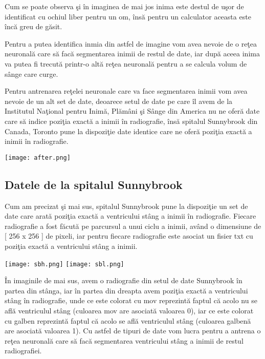 Cum se poate observa \c{s}i \^{i}n imaginea de mai jos inima este destul de u\c{s}or de identificat cu ochiul liber pentru un om, \^{i}ns\u{a} pentru un calculator aceasta este \^{i}nc\u{a} greu de g\u{a}sit.

\par

Pentru a putea identifica inmia din astfel de imagine vom avea nevoie de o re\c{t}ea neuronal\u{a} care s\u{a} fac\u{a} segmentarea inimii de restul de date, iar dup\u{a} aceea inima va putea fi trecut\u{a} printr-o alt\u{a} re\c{t}ea neuronal\u{a} pentru a se calcula volum de s\^{a}nge care curge.

\par

Pentru antrenarea re\c{t}elei neuronale care va face segmentarea inimii vom avea nevoie de un alt set de date, deoarece setul de date pe care \^{i}l avem de la Institutul Na\c{t}ional pentru Inim\u{a}, Pl\u{a}m\^{a}ni \c{s}i S\^{a}nge din America nu ne ofer\u{a} date care s\u{a} indice pozi\c{t}ia exact\u{a} a inimii \^{i}n radiografie, \^{i}ns\u{a} spitalul Sunnybrook din Canada, Toronto pune la dispozi\c{t}ie date identice care ne ofer\u{a} pozi\c{t}ia exact\u{a} a inimii \^{i}n radiografie.

\begin{center}
\texttt{[image: after.png]}
\end{center}

\subsection{Datele de la spitalul Sunnybrook}

Cum am precizat \c{s}i mai sus, spitalul Sunnybrook pune la dispozi\c{t}ie un set de date care arat\u{a} pozi\c{t}ia exact\u{a} a ventricului st\^{a}ng a inimii \^{i}n radiografie. Fiecare radiografie a fost f\u{a}cut\u{a} pe parcursul a unui ciclu a inimii, av\^{a}nd o dimensiune de [ 256 x 256 ] de pixeli, iar pentru fiecare radiografie este asociat  un fisier txt cu pozi\c{t}ia exact\u{a} a ventricului st\^{a}ng a inimii.

\begin{center}
\texttt{[image: sbh.png]}
\texttt{[image: sbl.png]}
\end{center}

\^{I}n imaginile de mai sus, avem o radiografie din setul de date Sunnybrook \^{i}n partea din st\^{a}nga, iar \^{i}n partea din dreapta avem pozi\c{t}ia exact\u{a} a ventricului st\^{a}ng \^{i}n radiografie, unde ce este colorat cu mov reprezint\u{a} faptul c\u{a} acolo nu se afl\u{a} ventriculul st\^{a}ng (culoarea mov are asociat\u{a} valoarea 0), iar ce este colorat cu galben reprezint\u{a} faptul c\u{a} acolo se afl\u{a} ventriculul st\^{a}ng (culoarea galben\u{a} are asociat\u{a} valoarea 1). Cu astfel de tipuri de date vom lucra pentru a antrena o re\c{t}ea neuronal\u{a} care s\u{a} fac\u{a} segmentarea ventricului st\^{a}ng a inimii de restul radiografiei. 

